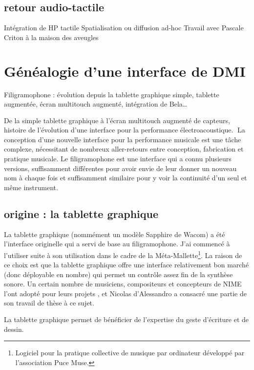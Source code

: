 \subsection{retour audio-tactile}
Intégration de HP tactile
Spatialisation ou diffusion ad-hoc
Travail avec Pascale Criton à la maison des aveugles


\section{Généalogie d’une interface de DMI}
\label{sec:interfaces:sec1}

Filigramophone : évolution depuis la tablette graphique simple, tablette augmentée, écran multitouch augmenté, intégration de Bela…

De la simple tablette graphique à l’écran multitouch augmenté de capteurs, histoire de l’évolution d’une interface pour la performance électroacoustique.
La conception d’une nouvelle interface pour la performance musicale est une tâche complexe, nécessitant de nombreux aller-retours entre conception, fabrication et pratique musicale. Le filigramophone est une interface qui a connu plusieurs versions, suffisamment différentes pour avoir envie de leur donner un nouveau nom à chaque fois et suffisamment similaire pour y voir la continuité d’un seul et même instrument.

\subsection{origine : la tablette graphique}
La tablette graphique (nommément un modèle Sapphire de Wacom) a été l’interface originelle qui a servi de base au filigramophone. J’ai commencé à l’utiliser suite à son utilisation dans le cadre de la Méta-Mallette\footnote{Logiciel pour la pratique collective de musique par ordinateur développé par l’association Puce Muse.}. La raison de ce choix est que la tablette graphique offre une interface relativement bon marché (donc déployable en nombre) qui permet un contrôle assez fin de la synthèse sonore.
Un certain nombre de musiciens, compositeurs et concepteurs de NIME l’ont adopté pour leurs projets \cite{zbyszynski_ten_2007}, et Nicolas d’Alessandro a consacré une partie de son travail de thèse \cite{dalessandro_realtime_2009} à ce sujet.

La tablette graphique permet de bénéficier de l’expertise du geste d’écriture et de dessin.


